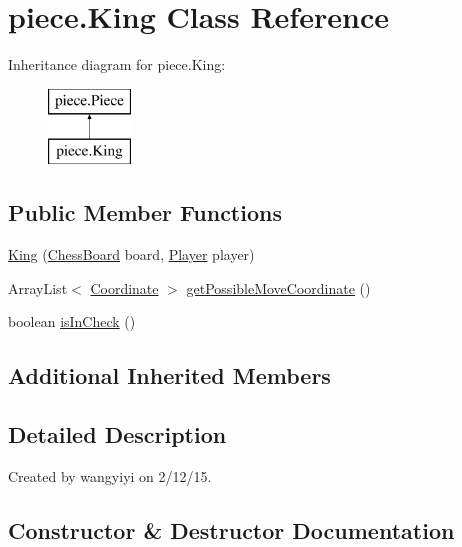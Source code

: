 \hypertarget{classpiece_1_1_king}{}\section{piece.\+King Class Reference}
\label{classpiece_1_1_king}
Inheritance diagram for piece.\+King\+:\begin{figure}[H]
\begin{center}
\leavevmode
\includegraphics[height=2.000000cm]{classpiece_1_1_king}
\end{center}
\end{figure}
\subsection*{Public Member Functions}
\begin{DoxyCompactItemize}
\item 
\hyperlink{classpiece_1_1_king_a8d0f35dc55155899732ded91c9e515a1}{King} (\hyperlink{classchessboard_1_1_chess_board}{Chess\+Board} board, \hyperlink{enumchessboard_1_1_player}{Player} player)
\item 
Array\+List$<$ \hyperlink{classpiece_1_1_coordinate}{Coordinate} $>$ \hyperlink{classpiece_1_1_king_a4b21f711fd2e4ac41b4bef0855652e95}{get\+Possible\+Move\+Coordinate} ()
\item 
boolean \hyperlink{classpiece_1_1_king_a1f07ebf057c6ae0c607c83b58f2e12c6}{is\+In\+Check} ()
\end{DoxyCompactItemize}
\subsection*{Additional Inherited Members}


\subsection{Detailed Description}
Created by wangyiyi on 2/12/15. 

\subsection{Constructor \& Destructor Documentation}
\hypertarget{classpiece_1_1_king_a8d0f35dc55155899732ded91c9e515a1}{}
